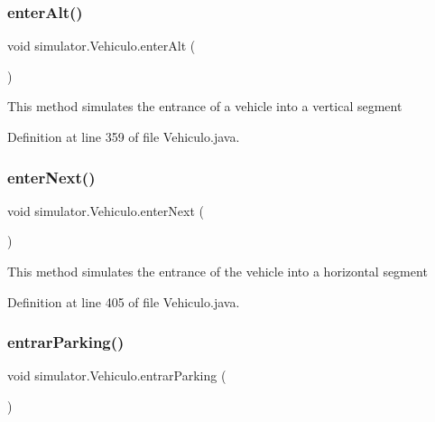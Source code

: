 \mbox{\label{classsimulator_1_1_vehiculo_aee3cf4905b7d3668f705d8bab550cf78}} 
\subsubsection{\texorpdfstring{enter\+Alt()}{enterAlt()}}
{\footnotesize\ttfamily void simulator.\+Vehiculo.\+enter\+Alt (\begin{DoxyParamCaption}{ }\end{DoxyParamCaption})}

This method simulates the entrance of a vehicle into a vertical segment 

Definition at line 359 of file Vehiculo.\+java.

\mbox{\label{classsimulator_1_1_vehiculo_ae2109a07a4719805b2b22fa2cfc74b9b}} 
\subsubsection{\texorpdfstring{enter\+Next()}{enterNext()}}
{\footnotesize\ttfamily void simulator.\+Vehiculo.\+enter\+Next (\begin{DoxyParamCaption}{ }\end{DoxyParamCaption})}

This method simulates the entrance of the vehicle into a horizontal segment 

Definition at line 405 of file Vehiculo.\+java.

\mbox{\label{classsimulator_1_1_vehiculo_aa860fe7afa2700e63751b39296a3dbe2}} 
\subsubsection{\texorpdfstring{entrar\+Parking()}{entrarParking()}}
{\footnotesize\ttfamily void simulator.\+Vehiculo.\+entrar\+Parking (\begin{DoxyParamCaption}{ }\end{DoxyParamCaption})}

